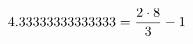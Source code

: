 \documentclass[preview]{standalone}
\begin{document}
\begin{align*}
\special{dvisvgm:raw <g id='unique000'>}4.33333333333333 = \frac{2 \cdot 8}{3} - 1\special{dvisvgm:raw </g>}
\end{align*}
\end{document}
